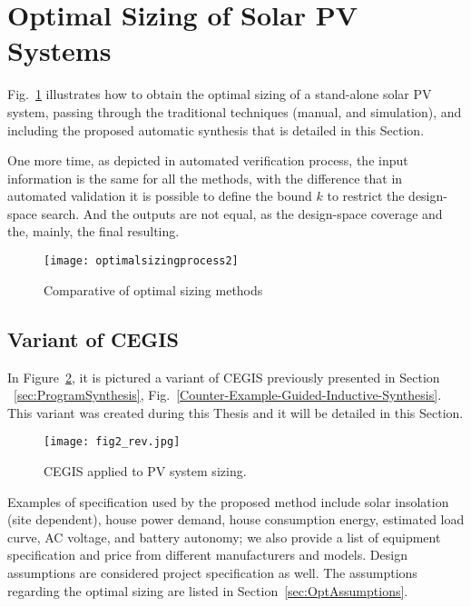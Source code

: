 %

\section{Optimal Sizing of Solar PV Systems}

Fig.~\ref{fig:optimization} illustrates how to obtain the optimal sizing of a stand-alone solar PV system, passing through the traditional techniques (manual, and simulation), and including the proposed automatic synthesis that is detailed in this Section. 

One more time, as depicted in automated verification process, the input information is the same for all the methods, with the difference that in automated validation it is possible to define the bound $k$ to restrict the design-space search. And the outputs are not equal, as the design-space coverage and the, mainly, the final resulting.

\begin{figure}[h]
\texttt{[image: optimalsizingprocess2]}
\centering
\caption{Comparative of optimal sizing methods}
\label{fig:optimization}
\end{figure}
 
\subsection{Variant of CEGIS} 

In Figure~\ref{CEGISalt}, it is pictured a variant of CEGIS previously presented in Section ~\ref{sec:ProgramSynthesis}, Fig.~\ref{Counter-Example-Guided-Inductive-Synthesis}. This variant was created during this Thesis and it will be detailed in this Section.

\begin{figure}[h]
	\centering
	\texttt{[image: fig2\_rev.jpg]}
	\caption{CEGIS applied to PV system sizing.}
	\label{CEGISalt}
\end{figure}

Examples of specification used by the proposed method include solar insolation (site dependent), house power demand, house consumption energy, estimated load curve, AC voltage, and battery autonomy; we also provide a list of equipment specification and price from different manufacturers and models. Design assumptions are considered project specification as well. The assumptions regarding the optimal sizing are listed in Section~\ref{sec:OptAssumptions}.

